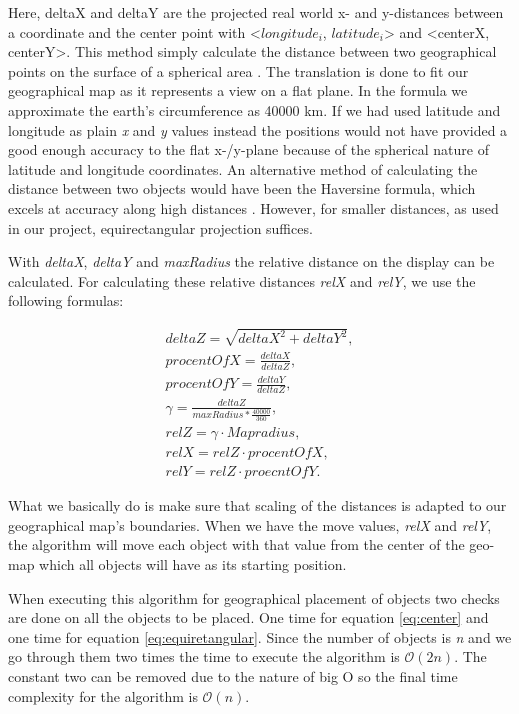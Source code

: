 Here, deltaX and deltaY are the projected real world x- and y-distances between a coordinate and the center point with <$longitude_i$, $latitude_i$> and <centerX, centerY>. This method simply calculate the distance between two geographical points on the surface of a spherical area \cite{equi}. The translation is done to fit our geographical map as it represents a view on a flat plane. In the formula we approximate the earth's circumference as 40000 km. If we had used latitude and longitude as plain \textit{x} and \textit{y} values instead the positions would not have provided a good enough accuracy to the flat x-/y-plane because of the spherical nature of latitude and longitude coordinates. An alternative method of calculating the distance between two objects would have been the Haversine formula, which excels at accuracy along high distances \cite{haversine}. However, for smaller distances, as used in our project, equirectangular projection suffices.

With \textit{deltaX}, \textit{deltaY} and \textit{maxRadius} the relative distance on the display can be calculated. For calculating these relative distances \textit{relX} and \textit{relY}, we use the following formulas:

\begin{align*}
deltaZ = \sqrt{deltaX^2 + deltaY^2}, \\
procentOfX = \frac{deltaX}{deltaZ}, \\
procentOfY = \frac{deltaY}{deltaZ}, \\
\gamma = \frac{deltaZ}{maxRadius*\frac{40000}{360}}, \\
relZ = \gamma \cdot Mapradius, \\
relX = relZ \cdot procentOfX, \\
relY = relZ \cdot proecntOfY.
\end{align*}

What we basically do is make sure that scaling of the distances is adapted to our geographical map's boundaries. When we have the move values, \textit{relX} and \textit{relY}, the algorithm will move each object with that value from the center of the geo-map which all objects will have as its starting position. 

When executing this algorithm for geographical placement of objects two checks are done on all the objects to be placed. One time for equation \ref{eq:center} and one time for equation \ref{eq:equiretangular}. Since the number of objects is \textit{n} and we go through them two times the time to execute the algorithm is $\mathcal{O}(2n)$. The constant two can be removed due to the nature of big O so the final time complexity for the algorithm is $\mathcal{O}(n)$.



